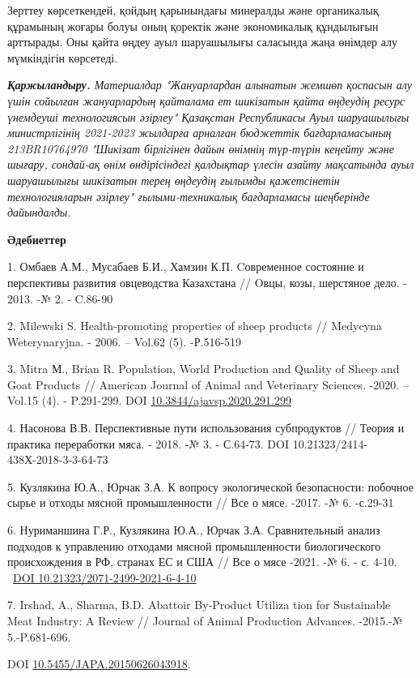 Зерттеу көрсеткендей, қойдың қарынындағы минералды және органикалық
құрамының жоғары болуы оның қоректік және экономикалық құндылығын
арттырады. Оны қайта өңдеу ауыл шаруашылығы саласында жаңа өнімдер алу
мүмкіндігін көрсетеді.

\emph{{\bfseries Қаржыландыру.} Материалдар "Жануарлардан алынатын жемшөп
қоспасын алу үшін сойылған жануарлардың қайталама ет шикізатын қайта
өңдеудің ресурс үнемдеуші технологиясын әзірлеу" Қазақстан Республикасы
Ауыл шаруашылығы министрлігінің 2021-2023 жылдарға арналған бюджеттік
бағдарламасының 213BR10764970 "Шикізат бірлігінен дайын өнімнің
түр-түрін кеңейту және шығару, сондай-ақ өнім өндірісіндегі қалдықтар
үлесін азайту мақсатында ауыл шаруашылығы шикізатын терең өңдеудің
ғылымды қажетсінетін технологияларын әзірлеу" ғылыми-техникалық
бағдарламасы шеңберінде дайындалды.}

{\bfseries Әдебиеттер}

1. Омбаев А.М., Мусабаев Б.И., Хамзин К.П. Cовременное состояние и
перспективы развития овцеводства Казахстана // Oвцы, козы, шерстяное
дело. - 2013. -№ 2. - C.86-90

2. Milewski S. Health-promoting properties of sheep products // Medycyna
Weterynaryjna. - 2006. -- Vol.62 (5). -Р.516-519

3. Mitra М., Brian R. Population, World Production and Quality of Sheep
and Goat Products // American Journal of Animal and Veterinary Sciences.
-2020. -- Vol.15 (4). - P.291-299. DOI
\href{https://doi.org/10.3844/ajavsp.2020.291.299}{10.3844/ajavsp.2020.291.299}

4. Насонова В.В. Перспективные пути использования субпродуктов // Теория
и практика переработки мяса. - 2018. -№ 3. - С.64-73. DOI
10.21323/2414-438Х-2018-3-3-64-73

5. Кузлякина Ю.А., Юрчак З.А. К вопросу экологической безопасности:
побочное сырье и отходы мясной промышленности // Все о мясе. -2017. -№
6. -с.29-31

6. Нуриманшина Г.Р., Кузлякина Ю.А., Юрчак З.А. Сравнительный анализ
подходов к управлению отходами мясной промышленности биологического
происхождения в РФ, странах ЕС и США // Все о мясе -2021. -№ 6. - с.
4-10. ~\href{https://doi.org/10.21323/2071-2499-2021-6-4-10}{DOI
10.21323/2071-2499-2021-6-4-10}

7. Irshad, A., Sharma, B.D. Abattoir By‑Product Utiliza tion for
Sustainable Meat Industry: A Review // Journal of Animal Production
Advances. -2015.-№ 5.-P.681-696.

DOI
\href{https://doi.org/10.5455/JAPA.20150626043918}{10.5455/JAPA.20150626043918}.

